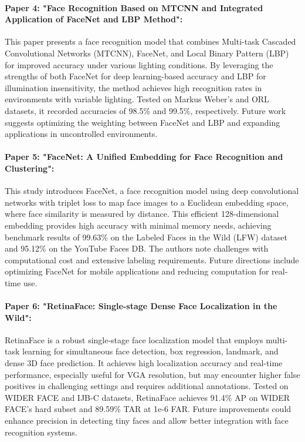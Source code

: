 \documentclass{article}
\begin{document}
\paragraph{ Paper 4: "Face Recognition Based on MTCNN and Integrated Application of FaceNet and LBP Method":}
This paper presents a face recognition model that combines Multi-task Cascaded Convolutional Networks (MTCNN), FaceNet, and Local Binary Pattern (LBP) for improved accuracy under various lighting conditions. By leveraging the strengths of both FaceNet for deep learning-based accuracy and LBP for illumination insensitivity, the method achieves high recognition rates in environments with variable lighting. Tested on Markus Weber’s and ORL datasets, it recorded accuracies of 98.5\% and 99.5\%, respectively. Future work suggests optimizing the weighting between FaceNet and LBP and expanding applications in uncontrolled environments.

\paragraph{ Paper 5: "FaceNet: A Unified Embedding for Face Recognition and Clustering":}
This study introduces FaceNet, a face recognition model using deep convolutional networks with triplet loss to map face images to a Euclidean embedding space, where face similarity is measured by distance. This efficient 128-dimensional embedding provides high accuracy with minimal memory needs, achieving benchmark results of 99.63\% on the Labeled Faces in the Wild (LFW) dataset and 95.12\% on the YouTube Faces DB. The authors note challenges with computational cost and extensive labeling requirements. Future directions include optimizing FaceNet for mobile applications and reducing computation for real-time use.

\paragraph{ Paper 6: "RetinaFace: Single-stage Dense Face Localization in the Wild":}
RetinaFace is a robust single-stage face localization model that employs multi-task learning for simultaneous face detection, box regression, landmark, and dense 3D face prediction. It achieves high localization accuracy and real-time performance, especially useful for VGA resolution, but may encounter higher false positives in challenging settings and requires additional annotations. Tested on WIDER FACE and IJB-C datasets, RetinaFace achieves 91.4\% AP on WIDER FACE’s hard subset and 89.59\% TAR at 1e-6 FAR. Future improvements could enhance precision in detecting tiny faces and allow better integration with face recognition systems.
\end{document}
